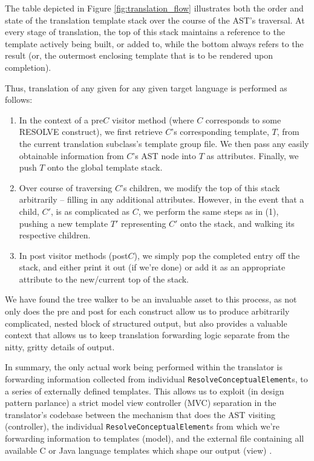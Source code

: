 \documentclass[times]{speauth}
\begin{document}
The table depicted in Figure \ref{fig:translation_flow} illustrates both the order and state of the translation template stack over the course of the AST's traversal. At every stage of translation, the top of this stack maintains a reference to the template actively being built, or added to, while the bottom always refers to the result (or, the outermost enclosing template that is to be rendered upon completion).

Thus, translation of any given for any given target language is performed as follows:
\begin{enumerate}
\item In the context of a pre$C$ visitor method (where $C$ corresponds to some RESOLVE construct), we first retrieve $C$'s corresponding template, $T$, from the current translation subclass's template group file. We then pass any easily obtainable information from $C$'s AST node into $T$ as attributes. Finally, we push $T$ onto the global template stack.

\item Over course of traversing $C$'s children, we modify the top of this stack arbitrarily -- filling in any additional attributes. However, in the event that a child, $C'$, is as complicated as $C$, we perform the same steps as in (1), pushing a new template $T'$ representing $C'$ onto the stack, and walking its respective children.

\item In post visitor methods (post$C$), we simply pop the completed entry off the stack, and either print it out (if we're done) or add it as an appropriate attribute to the new/current top of the stack.
\end{enumerate}

We have found the tree walker to be an invaluable asset to this process, as not only does the pre and post for each construct allow us to produce arbitrarily complicated, nested block of structured output, but also provides a valuable context that allows us to keep translation forwarding logic separate from the nitty, gritty details of output.

In summary, the only actual work being performed within the translator is forwarding information collected from individual \texttt{ResolveConceptualElement}s, to a series of externally defined templates. This allows us to exploit (in design pattern parlance) a strict model view controller (MVC) separation in the translator's codebase between the mechanism that does the AST visiting (controller), the individual \texttt{ResolveConceptualElement}s from which we're forwarding information to templates (model), and the external file containing all available C or Java language templates which shape our output (view) \cite{parr:2004,krasner:1988}.
\end{document}
